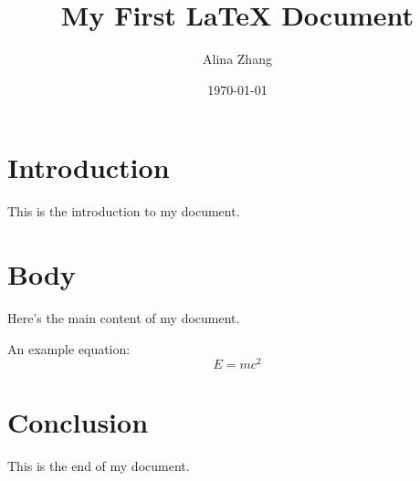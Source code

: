 
\usepackage{amsmath}    %
\usepackage{graphicx}   %
\usepackage{hyperref}   %

\title{My First LaTeX Document}
\author{Alina Zhang}
\date{\today}           %



\maketitle              %

\section{Introduction}
This is the introduction to my document.

\section{Body}
Here's the main content of my document. 

An example equation:
\begin{equation}
    E = mc^2
\end{equation}

\section{Conclusion}
This is the end of my document.



